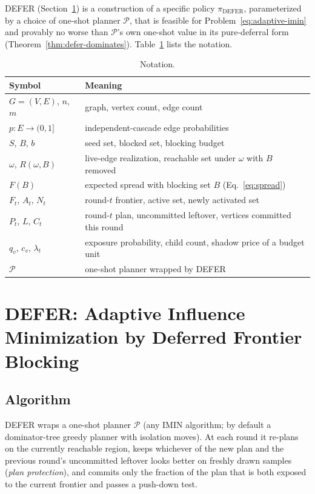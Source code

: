 \documentclass[preprint,11pt]{elsarticle}
\theoremstyle{definition}
\theoremstyle{remark}
\newcommand{\up}{\rule{0pt}{2.6ex}}
\newcommand{\down}{\rule[-1.2ex]{0pt}{0pt}}
\newcommand{\Rspread}{R}
\newcommand{\FF}{F}
\begin{document}
DEFER (Section~\ref{sec:defer}) is a construction of a specific policy $\pi_{\mathrm{DEFER}}$, parameterized by a choice of one-shot planner $\mathcal P$, that is feasible for Problem~\eqref{eq:adaptive-imin} and provably no worse than $\mathcal P$'s own one-shot value in its pure-deferral form (Theorem~\ref{thm:defer-dominates}). Table~\ref{tab:notation} lists the notation.

\begin{table}[h]
\centering
\caption{Notation.}\label{tab:notation}
\small
\begin{tabular}{@{}ll@{}}
\hline
\up Symbol & Meaning \\
\hline
\up $G=(V,E)$, $n$, $m$ & graph, vertex count, edge count \\
$p:E\to(0,1]$ & independent-cascade edge probabilities \\
$S$, $B$, $b$ & seed set, blocked set, blocking budget \\
$\omega$, $\Rspread(\omega,B)$ & live-edge realization, reachable set under $\omega$ with $B$ removed \\
$\FF(B)$ & expected spread with blocking set $B$ (Eq.~\ref{eq:spread}) \\
$F_t$, $A_t$, $N_t$ & round-$t$ frontier, active set, newly activated set \\
$P_t$, $L$, $C_t$ & round-$t$ plan, uncommitted leftover, vertices committed this round \\
$q_v$, $c_v$, $\lambda_t$ & exposure probability, child count, shadow price of a budget unit \\
\down $\mathcal P$ & one-shot planner wrapped by DEFER \\
\hline
\end{tabular}
\end{table}
\section{DEFER: Adaptive Influence Minimization by Deferred Frontier Blocking}\label{sec:defer}

\subsection{Algorithm}\label{sec:defer-algo}

DEFER wraps a one-shot planner $\mathcal P$ (any IMIN algorithm; by default
a dominator-tree greedy planner with isolation moves). At each round it
re-plans on the currently reachable region, keeps whichever of the new plan
and the previous round's uncommitted leftover looks better on freshly drawn
samples (\emph{plan protection}), and commits only the fraction of the plan
that is both exposed to the current frontier and passes a push-down test.
\end{document}
